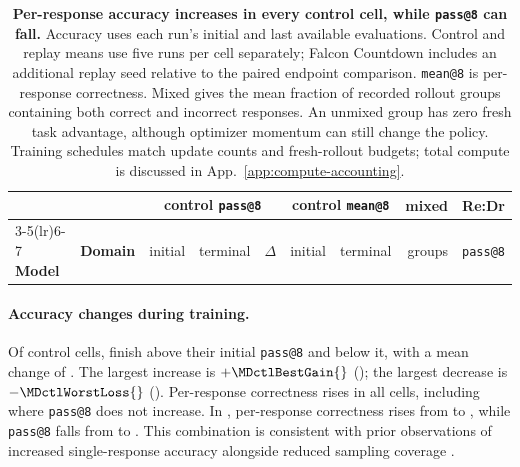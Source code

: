 \documentclass{article}
\newcommand{\1}{\mathbf 1}
\theoremstyle{remark}
\theoremstyle{definition}
\theoremstyle{plain}
\begin{document}
\begin{table}[t]
  \centering
  \caption{\textbf{Per-response accuracy increases in every control cell,
  while \texttt{pass@8} can fall.} Accuracy uses each run's initial and last
  available evaluations. Control and replay means use five runs per cell
  separately; Falcon Countdown includes an additional replay seed relative
  to the paired endpoint comparison. \texttt{mean@8} is per-response
  correctness. Mixed gives the mean fraction of recorded rollout groups
  containing both correct and incorrect responses. An unmixed group has
  zero fresh task advantage, although optimizer momentum can still change
  the policy. Training schedules match update counts and fresh-rollout
  budgets; total compute is discussed in App.~\ref{app:compute-accounting}.}
  \label{tab:control-learning-audit}
  \small
  \setlength{\tabcolsep}{5pt}
  \begin{tabular}{@{}llrrrrrrr@{}}
    \toprule
    & & \multicolumn{3}{c}{\textbf{control \texttt{pass@8}}}
      & \multicolumn{2}{c}{\textbf{control \texttt{mean@8}}}
      & \textbf{mixed} & \textbf{Re:Dr} \\
    \cmidrule(lr){3-5}\cmidrule(lr){6-7}
    \textbf{Model} & \textbf{Domain} & initial & terminal & $\Delta$
      & initial & terminal & groups & \texttt{pass@8} \\
    \midrule
    
  \end{tabular}
\end{table}

\paragraph{Accuracy changes during training.}
Of \MDctlCells{} control cells, \MDctlGains{} finish above their initial
\texttt{pass@8} and \MDctlLosses{} below it, with a mean change of
\MDctlMeanDelta{}. The largest increase is $+\MDctlBestGain{}$
(\MDctlBestGainCell{}); the largest decrease is $-\MDctlWorstLoss{}$
(\MDctlWorstLossCell{}). Per-response correctness rises in all
\MDctlMeanUp{} cells, including \MDctlYue{} where \texttt{pass@8} does not
increase. In \MDctlPatternCell{}, per-response correctness rises from
\MDctlPatternMeanFrom{} to \MDctlPatternMeanTo{}, while \texttt{pass@8}
falls from \MDctlPatternPassFrom{} to \MDctlPatternPassTo{}.
This combination is consistent with prior observations of increased
single-response accuracy alongside reduced sampling coverage
\citep{yue2025rlvrlimit}.
\end{document}
